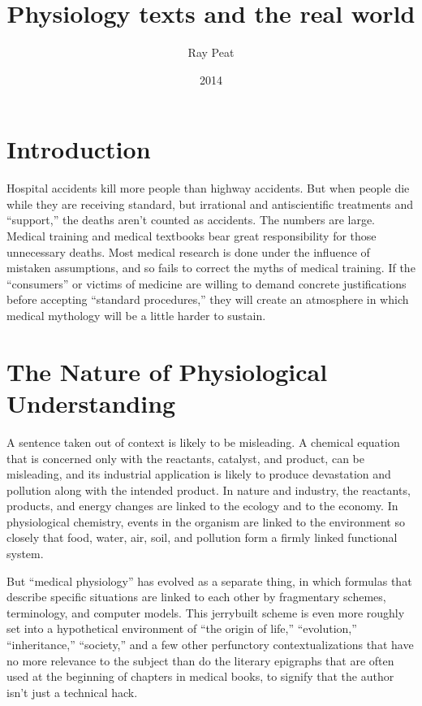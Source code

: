 \documentclass{article}
\title{Physiology texts and the real world}
\author{Ray Peat}
\date{2014}
\begin{document}
\maketitle

\section*{Introduction}

Hospital accidents kill more people than highway accidents. But when people die while they are receiving standard, but irrational and antiscientific treatments and “support,” the deaths aren’t counted as accidents. The numbers are large.
Medical training and medical textbooks bear great responsibility for those unnecessary deaths. Most medical research is done under the influence of mistaken assumptions, and so fails to correct the myths of medical training. If the “consumers” or victims of medicine are willing to demand concrete justifications before accepting “standard procedures,” they will create an atmosphere in which medical mythology will be a little harder to sustain.

\section*{The Nature of Physiological Understanding}

A sentence taken out of context is likely to be misleading. A chemical equation that is concerned only with the reactants, catalyst, and product, can be misleading, and its industrial application is likely to produce devastation and pollution along with the intended product. In nature and industry, the reactants, products, and energy changes are linked to the ecology and to the economy. In physiological chemistry, events in the organism are linked to the environment so closely that food, water, air, soil, and pollution form a firmly linked functional system.

But “medical physiology” has evolved as a separate thing, in which formulas that describe specific situations are linked to each other by fragmentary schemes, terminology, and computer models. This jerrybuilt scheme is even more roughly set into a hypothetical environment of “the origin of life,” “evolution,” “inheritance,” “society,” and a few other perfunctory contextualizations that have no more relevance to the subject than do the literary epigraphs that are often used at the beginning of chapters in medical books, to signify that the author isn’t just a technical hack.
\end{document}
